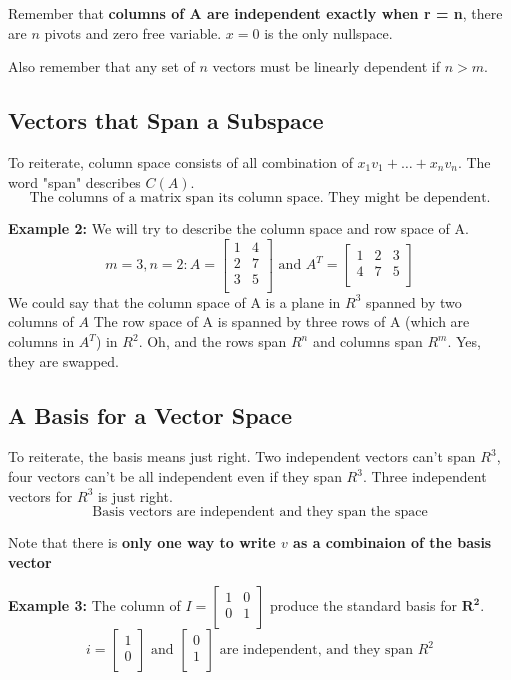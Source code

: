 Remember that \textbf{columns of A are independent exactly when r = n}, there are \(n\) pivots and zero free variable. \(x = 0\) is the only nullspace. 

Also remember that any set of \(n\) vectors must be linearly dependent if \(n > m\). 

\subsection{Vectors that Span a Subspace}

To reiterate, column space consists of all combination of \(x_{1}v_1 + \ldots + x_{n}v_n\). The word "span" describes \(C(A)\). 
\[
    \text{The columns of a matrix span its column space. They might be dependent.}
\]  

\textbf{Example 2:} We will try to describe the column space and row space of A. 
\[
    m = 3, n = 2: 
    A = 
    \begin{bmatrix}
        1 & 4  \\
        2 & 7  \\
        3 & 5  \\
    \end{bmatrix}
    \text{ and }
    A^T = 
    \begin{bmatrix}
        1 & 2 & 3  \\
        4 & 7 & 5  \\
    \end{bmatrix}
\] 
We could say that the column space of A is a plane in \(R^3\) spanned by two columns of \(A\) The row space of A is spanned by three rows of A (which are columns in \(A^T\)) in \(R^2\). Oh, and the rows span \(R^n\) and columns span \(R^m\). Yes, they are swapped. 

\subsection{A Basis for a Vector Space}
To reiterate, the basis means just right. Two independent vectors can't span \(R^3\), four vectors can't be all independent even if they span \(R^3\). Three independent vectors for \(R^3\) is just right. 
\[
    \text{Basis vectors are independent and they span the space}
\]    

Note that there is \textbf{only one way to write \(v\) as a combinaion of the basis vector}

\textbf{Example 3:} The column of \(I = \begin{bmatrix}
    1 & 0  \\
    0 & 1  \\
\end{bmatrix}\) produce the standard basis for \(\mathbf{R^2}\). 
\[
    i = 
    \begin{bmatrix}
         1 \\
         0 \\
    \end{bmatrix}
    \text{ and }
    \begin{bmatrix}
         0 \\
         1 \\
    \end{bmatrix}
    \text{ are independent, and they span \(R^2\)}
\] 

